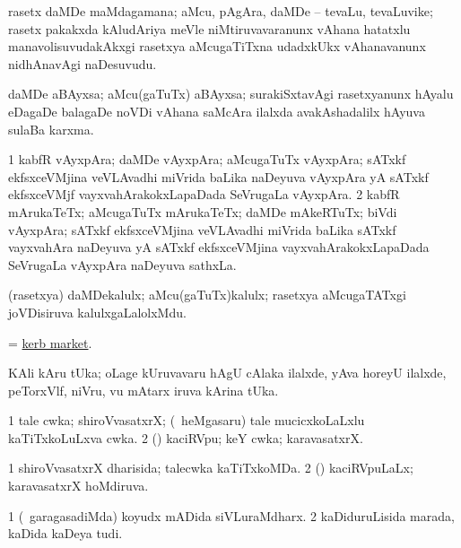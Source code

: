 \bentry
{}
\gl{\nA}
\bmng
rasetx daMDe maMdagamana; aMcu, pAgAra, daMDe -- tevaLu, tevaLuvike; rasetx pakakxda kAludAriya meVle niMtiruvavaranunx vAhana hatatxlu manavolisuvudakAkxgi rasetxya aMcugaTiTxna udadxkUkx vAhanavanunx nidhAnavAgi naDesuvudu. 
\emng
\eentry

\bentry
{}
\gl{\nA}
\bmng
daMDe aBAyxsa; aMcu(gaTuTx) aBAyxsa; surakiSxtavAgi rasetxyanunx hAyalu eDagaDe balagaDe noVDi vAhana saMcAra ilalxda avakAshadalilx hAyuva sulaBa karxma. 
\emng
\eentry

\bentry
{}
\gl{\nA}
\bmng
\bnum
\num{1} kabfR vAyxpAra; daMDe vAyxpAra; aMcugaTuTx vAyxpAra; sATxkf ekfsxceVMjina veVLAvadhi miVrida baLika naDeyuva vAyxpAra yA sATxkf ekfsxceVMjf vayxvahArakokxLapaDada SeVrugaLa vAyxpAra. 
\num{2} kabfR mArukaTeTx; aMcugaTuTx mArukaTeTx; daMDe mAkeRTuTx; biVdi vAyxpAra; sATxkf ekfsxceVMjina veVLAvadhi miVrida baLika sATxkf vayxvahAra naDeyuva yA sATxkf ekfsxceVMjina vayxvahArakokxLapaDada SeVrugaLa vAyxpAra naDeyuva sathxLa. 
\enum
\emng
\eentry

\bentry
{}
\gl{\nA}
\bmng
(rasetxya) daMDekalulx; aMcu(gaTuTx)kalulx; rasetxya aMcugaTATxgi joVDisiruva kalulxgaLalolxMdu. 
\emng
\eentry

\bentry
{}
\gl{\nA}
\bmng
 = \hyperlink{kerb market}{kerb market}. 
\emng
\eentry

\bentry
{}
\gl{\nA}
\bmng
KAli kAru tUka; oLage kUruvavaru hAgU cAlaka ilalxde, yAva horeyU ilalxde, peTorxVlf, niVru, \mo vu mAtarx iruva kArina tUka. 
\emng
\eentry

\bentry
{}
\gl{\nA}
\bmng
\bnum
\num{1} tale cwka; shiroVvasatxrX; (\kanmu\ heMgasaru) tale mucicxkoLaLxlu kaTiTxkoLuLxva cwka. 
\num{2} (\kAparx) kaciRVpu; keY cwka; karavasatxrX.   
\enum
\emng
\eentry

\bentry
{}
\gl{\gu}
\bmng
\bnum
\num{1} shiroVvasatxrX dharisida; talecwka kaTiTxkoMDa. 
\num{2} (\kAparx) kaciRVpuLaLx; karavasatxrX hoMdiruva. 
\enum
\emng
\eentry

\bentry
{}
\gl{\nA}
\bmng
\bnum
\num{1} (\kanmu\ garagasadiMda) koyudx mADida siVLuraMdharx. 
\num{2} kaDiduruLisida marada, kaDida kaDeya tudi. 
\enum
\emng
\eentry

